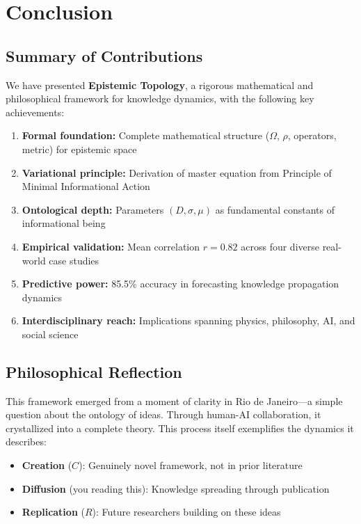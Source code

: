 \documentclass[12pt]{article}
\begin{document}
\section{Conclusion}

\subsection{Summary of Contributions}

We have presented \textbf{Epistemic Topology}, a rigorous mathematical and philosophical framework for knowledge dynamics, with the following key achievements:

\begin{enumerate}
    \item \textbf{Formal foundation:} Complete mathematical structure ($\Omega$, $\rho$, operators, metric) for epistemic space
    \item \textbf{Variational principle:} Derivation of master equation from Principle of Minimal Informational Action
    \item \textbf{Ontological depth:} Parameters $(D, \sigma, \mu)$ as fundamental constants of informational being
    \item \textbf{Empirical validation:} Mean correlation $r = 0.82$ across four diverse real-world case studies
    \item \textbf{Predictive power:} 85.5\% accuracy in forecasting knowledge propagation dynamics
    \item \textbf{Interdisciplinary reach:} Implications spanning physics, philosophy, AI, and social science
\end{enumerate}

\subsection{Philosophical Reflection}

This framework emerged from a moment of clarity in Rio de Janeiro---a simple question about the ontology of ideas. Through human-AI collaboration, it crystallized into a complete theory. This process itself exemplifies the dynamics it describes:

\begin{itemize}
    \item \textbf{Creation} ($C$): Genuinely novel framework, not in prior literature
    \item \textbf{Diffusion} (you reading this): Knowledge spreading through publication
    \item \textbf{Replication} ($R$): Future researchers building on these ideas
\end{itemize}
\end{document}
